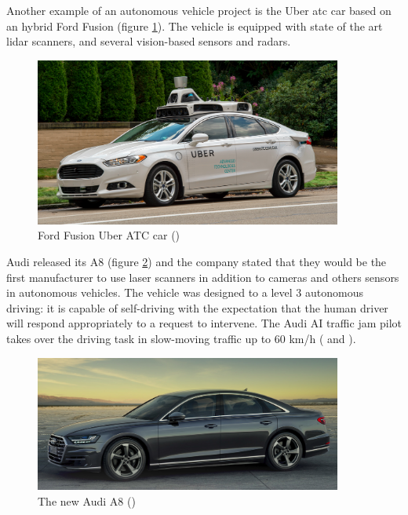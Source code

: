 Another example of an autonomous vehicle project is the Uber \gls{atc} car based on an hybrid Ford Fusion (figure \ref{fig:uber}). The vehicle is equipped with state of the art \gls{lidar} scanners, and several vision-based sensors and radars.

\begin{figure}[htp]
	
	\centering
	\includegraphics[width=0.9\textwidth]{capstate/imgs/uber}
	
	\caption{Ford Fusion Uber ATC car (\cite{UberAdvancedTechnologiesGroup})}
	\label{fig:uber}
	
\end{figure}

Audi released its A8 (figure \ref{fig:audi}) and the company stated that they would be the first manufacturer to use laser scanners in addition to cameras and others sensors in autonomous vehicles. The vehicle was designed to a level 3 autonomous driving: it is capable of self-driving with the expectation that the human driver will respond appropriately to a request to intervene. The Audi AI traffic jam pilot takes over the driving task in slow-moving traffic up to 60 km/h (\cite{AudiMediaCenter} and \cite{AndreasHerrmannWalterBrenner2018}).

\begin{figure}[htp]
	
	\centering
	\includegraphics[width=0.9\textwidth]{capstate/imgs/audi}
	
	\caption{The new Audi A8 (\cite{AudiMediaCenter})}
	\label{fig:audi}
	
\end{figure}

